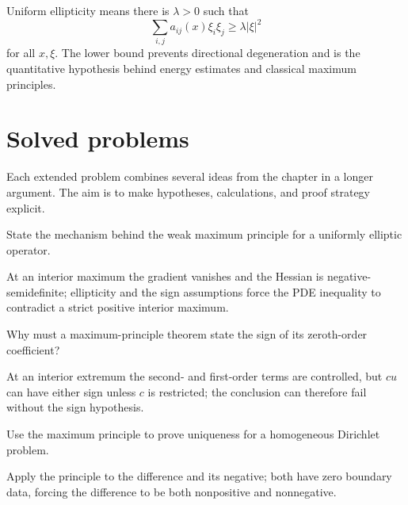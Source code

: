 \begin{example}\label{ex:iii27-worked-04}
Uniform ellipticity means there is \(\lambda>0\) such that
\[
\sum_{i,j}a_{ij}(x)\xi_i\xi_j\ge\lambda|\xi|^2
\]
for all \(x,\xi\). The lower bound prevents directional degeneration and is the
quantitative hypothesis behind energy estimates and classical maximum
principles.
\end{example}

\section{Solved problems}
Each extended problem combines several ideas from the chapter in a longer argument. The aim is to make hypotheses, calculations, and proof strategy explicit.

\begin{problem}\label{prob:iii27-problem-01}
State the mechanism behind the weak maximum principle for a uniformly elliptic operator.
\end{problem}
\begin{solution}
At an interior maximum the gradient vanishes and the Hessian is
negative-semidefinite; ellipticity and the sign assumptions force the PDE
inequality to contradict a strict positive interior maximum.
\end{solution}

\begin{problem}\label{prob:iii27-problem-02}
Why must a maximum-principle theorem state the sign of its zeroth-order coefficient?
\end{problem}
\begin{solution}
At an interior extremum the second- and first-order terms are controlled,
but \(cu\) can have either sign unless \(c\) is restricted; the conclusion can
therefore fail without the sign hypothesis.
\end{solution}

\begin{problem}\label{prob:iii27-problem-03}
Use the maximum principle to prove uniqueness for a homogeneous Dirichlet problem.
\end{problem}
\begin{solution}
Apply the principle to the difference and its negative; both have zero
boundary data, forcing the difference to be both nonpositive and nonnegative.
\end{solution}

